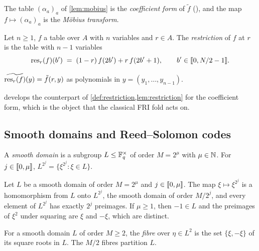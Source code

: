 The table $(\alpha_a)_a$ of \cref{lem:mobius} is the \emph{coefficient form} of $\tilde f$ (), and the map $f \mapsto (\alpha_a)_a$ is the \emph{M\"obius transform}.

\begin{definition}\label{def:restriction}
Let $n \ge 1$, $f$ a table over $A$ with $n$ variables and $r \in A$. The \emph{restriction} of $f$ at $r$ is the table with $n-1$ variables
\[
  \mathrm{res}_r(f)(b') \;=\; (1-r)\, f(2b') + r\, f(2b'+1), \qquad b' \in \llbracket 0, N/2-1 \rrbracket.
\]
\end{definition}

\begin{lemma}\label{lem:restriction}
$\widetilde{\mathrm{res}_r(f)}(y) = \tilde f(r, y)$ as polynomials in $y = (y_1,\dots,y_{n-1})$.
\end{lemma}

 develops the counterpart of \cref{def:restriction,lem:restriction} for the coefficient form, which is the object that the classical FRI fold acts on.

\subsection{Smooth domains and Reed--Solomon codes}\label{sec:prelim:rs}

\begin{definition}\label{def:domain}
A \emph{smooth domain} is a subgroup $L \le \mathbb{F}_q^\times$ of order $M = 2^\mu$ with $\mu \in \mathbb{N}$.
For $j \in \llbracket 0, \mu \rrbracket$, $L^{2^j} = \{\xi^{2^j} : \xi \in L\}$.
\end{definition}

\begin{lemma}\label{lem:power}
Let $L$ be a smooth domain of order $M = 2^\mu$ and $j \in \llbracket 0, \mu \rrbracket$.
The map $\xi \mapsto \xi^{2^j}$ is a homomorphism from $L$ onto $L^{2^j}$, the smooth domain of order $M/2^j$, and every element of $L^{2^j}$ has exactly $2^j$ preimages.
If $\mu \ge 1$, then $-1 \in L$ and the preimages of $\xi^2$ under squaring are $\xi$ and $-\xi$, which are distinct.
\end{lemma}

\begin{definition}\label{def:fibre}
For a smooth domain $L$ of order $M \ge 2$, the \emph{fibre} over $\eta \in L^2$ is the set $\{\xi,-\xi\}$ of its square roots in $L$.
The $M/2$ fibres partition $L$.
\end{definition}

